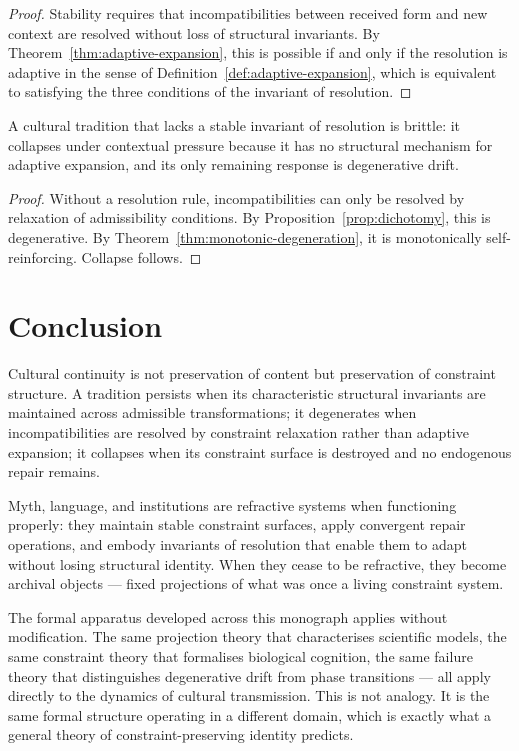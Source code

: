 \documentclass[11pt,openany]{book}
\begin{document}
\begin{proof}
Stability requires that incompatibilities between received
form and new context are resolved without loss of
structural invariants.  By
Theorem~\ref{thm:adaptive-expansion}, this is possible
if and only if the resolution is adaptive in the sense of
Definition~\ref{def:adaptive-expansion}, which is
equivalent to satisfying the three conditions of the
invariant of resolution.
\end{proof}

\begin{corollary}
\label{cor:fragility}
A cultural tradition that lacks a stable invariant of
resolution is brittle: it collapses under contextual
pressure because it has no structural mechanism for
adaptive expansion, and its only remaining response is
degenerative drift.
\end{corollary}

\begin{proof}
Without a resolution rule, incompatibilities can only be
resolved by relaxation of admissibility conditions.  By
Proposition~\ref{prop:dichotomy}, this is degenerative.
By Theorem~\ref{thm:monotonic-degeneration}, it is
monotonically self-reinforcing.  Collapse follows.
\end{proof}

\section{Conclusion}
\label{sec:conclusion-culture}

Cultural continuity is not preservation of content but
preservation of constraint structure.  A tradition
persists when its characteristic structural invariants
are maintained across admissible transformations; it
degenerates when incompatibilities are resolved by
constraint relaxation rather than adaptive expansion;
it collapses when its constraint surface is destroyed
and no endogenous repair remains.

Myth, language, and institutions are refractive systems
when functioning properly: they maintain stable constraint
surfaces, apply convergent repair operations, and embody
invariants of resolution that enable them to adapt without
losing structural identity.  When they cease to be
refractive, they become archival objects — fixed projections
of what was once a living constraint system.

The formal apparatus developed across this monograph
applies without modification.  The same projection theory
that characterises scientific models, the same constraint
theory that formalises biological cognition, the same
failure theory that distinguishes degenerative drift from
phase transitions — all apply directly to the dynamics of
cultural transmission.  This is not analogy.  It is the
same formal structure operating in a different domain, which
is exactly what a general theory of constraint-preserving
identity predicts.
\end{document}
